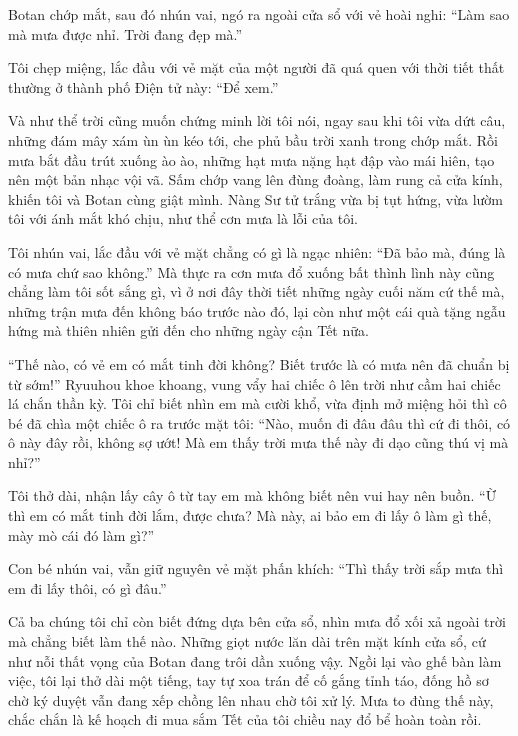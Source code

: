 \documentclass[../main.tex]{subfiles}
\begin{document}
Botan chớp mắt, sau đó nhún vai, ngó ra ngoài cửa sổ với vẻ hoài nghi: ``Làm sao mà mưa được nhỉ. Trời đang đẹp mà.''

Tôi chẹp miệng, lắc đầu với vẻ mặt của một người đã quá quen với thời tiết thất thường ở thành phố Điện tử này: ``Để xem.''

Và như thể trời cũng muốn chứng minh lời tôi nói, ngay sau khi tôi vừa dứt câu, những đám mây xám ùn ùn kéo tới, che phủ bầu trời xanh trong chớp mắt. Rồi mưa bắt đầu trút xuống ào ào, những hạt mưa nặng hạt đập vào mái hiên, tạo nên một bản nhạc vội vã. Sấm chớp vang lên đùng đoàng, làm rung cả cửa kính, khiến tôi và Botan cùng giật mình. Nàng Sư tử trắng vừa bị tụt hứng, vừa lườm tôi với ánh mắt khó chịu, như thể cơn mưa là lỗi của tôi.


Tôi nhún vai, lắc đầu với vẻ mặt chẳng có gì là ngạc nhiên: ``Đã bảo mà, đúng là có mưa chứ sao không.'' Mà thực ra cơn mưa đổ xuống bất thình lình này cũng chẳng làm tôi sốt sắng gì, vì ở nơi đây thời tiết những ngày cuối năm cứ thế mà, những trận mưa đến không báo trước nào đó, lại còn như một cái quà tặng ngẫu hứng mà thiên nhiên gửi đến cho những ngày cận Tết nữa.

``Thế nào, có vẻ em có mắt tinh đời không? Biết trước là có mưa nên đã chuẩn bị từ sớm!'' Ryuuhou khoe khoang, vung vẩy hai chiếc ô lên trời như cầm hai chiếc lá chắn thần kỳ. Tôi chỉ biết nhìn em mà cười khổ, vừa định mở miệng hỏi thì cô bé đã chìa một chiếc ô ra trước mặt tôi: ``Nào, muốn đi đâu đâu thì cứ đi thôi, có ô này đây rồi, không sợ ướt! Mà em thấy trời mưa thế này đi dạo cũng thú vị mà nhỉ?''

Tôi thở dài, nhận lấy cây ô từ tay em mà không biết nên vui hay nên buồn. ``Ừ thì em có mắt tinh đời lắm, được chưa? Mà này, ai bảo em đi lấy ô làm gì thế, mày mò cái đó làm gì?''

Con bé nhún vai, vẫn giữ nguyên vẻ mặt phấn khích: ``Thì thấy trời sắp mưa thì em đi lấy thôi, có gì đâu.''

Cả ba chúng tôi chỉ còn biết đứng dựa bên cửa sổ, nhìn mưa đổ xối xả ngoài trời mà chẳng biết làm thế nào. Những giọt nước lăn dài trên mặt kính cửa sổ, cứ như nỗi thất vọng của Botan đang trôi dần xuống vậy. Ngồi lại vào ghế bàn làm việc, tôi lại thở dài một tiếng, tay tự xoa trán để cố gắng tỉnh táo, đống hồ sơ chờ ký duyệt vẫn đang xếp chồng lên nhau chờ tôi xử lý. Mưa to đùng thế này, chắc chắn là kế hoạch đi mua sắm Tết của tôi chiều nay đổ bể hoàn toàn rồi.
\end{document}
